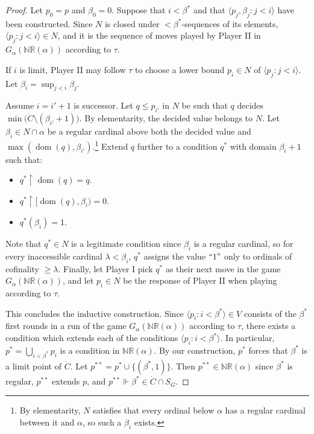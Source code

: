 \documentclass[11pt]{amsart}
\renewcommand{\restriction}{\mathbin\upharpoonright}    %
\theoremstyle{definition}
\newcounter{condition}
\theoremstyle{remark}
\newcommand\<{{<}}
\newcommand{\dom}{\mathop{\mathrm{dom}}\nolimits}
\newcommand{\la}{\langle}
\newcommand{\ra}{\rangle}
\begin{document}
\begin{proof}
        Let $p_0 = p$ and $\beta_0 = 0$. Suppose that $i<\beta^*$ and that $\langle p_j, \beta_j \colon j<i\rangle$ have been constructed. Since $N$ is closed under $<\beta^*$-sequences of its elements, $\langle p_j \colon j<i\rangle \in N$, and it is the sequence of moves played by Player II in $G_\alpha(\mathbb{NR}(\alpha))$ according to $\tau$.

        If $i$ is limit, Player II may follow $\tau$ to choose a lower bound $p_i \in N$ of $\langle p_j \colon j<i\rangle$. Let $\beta_i = \sup_{j<i} \beta_j$.

        Assume $i = i'+1$ is successor. Let $q \leq p_{i'}$ in $N$ be such that $q$ decides $\min\big(\dot{C} \setminus (\beta_{i'}+1)\big)$. By elementarity, the decided value belongs to $N$. Let $\beta_i \in N \cap \alpha$ be a regular cardinal above both the decided value and $\max(\dom(q), \beta_{i'})$.\footnote{By elementarity, $N$ satisfies that every ordinal below $\alpha$ has a regular cardinal between it and $\alpha$, so such a $\beta_i$ exists.} Extend $q$ further to a condition $q^*$ with domain $\beta_i+1$ such that:
\begin{itemize}
            \item $q^*\restriction \dom(q) = q$.
            \item $q^*\restriction [\dom(q), \beta_{i}) = 0$.
            \item $q^*(\beta_{i}) = 1$.
        \end{itemize}
        Note that $q^*\in N$ is a legitimate condition since $\beta_{i}$ is a regular cardinal, so for every inaccessible cardinal $\lambda<\beta_{i}$, $q^*$ assigns the value $``1"$ only to ordinals of cofinality $\geq \lambda$. 
        Finally, let Player I pick $q^*$ as their next move in the game $G_\alpha(\mathbb{NR}(\alpha))$, and let $p_{i}\in N$ be the response of Player II when playing according to $\tau$. 

        This concludes the inductive construction. Since $\la p_i \colon i<\beta^* \ra\in V$ consists of the $\beta^*$ first rounds in a run of the game $G_\alpha(\mathbb{NR}(\alpha))$ according to $\tau$, there exists a condition which extends each of the conditions $\la p_i \colon i<\beta^*\ra$. In particular, $p^* = \bigcup_{i<\beta^*} p_i$ is a condition in $\mathbb{NR}(\alpha)$. By our construction, $p^*$ forces that $\beta^*$ is a limit point of $\dot{C}$. Let $p^{**} = p^*\cup \{ (\beta^*, 1) \}$. Then $p^{**}\in \mathbb{NR}(\alpha)$ since $\beta^*$ is regular, $p^{**}$ extends $p$, and $p^{**}\Vdash \beta^* \in \dot{C}\cap S_{\dot{G}}$.
    \end{proof}
\end{document}
